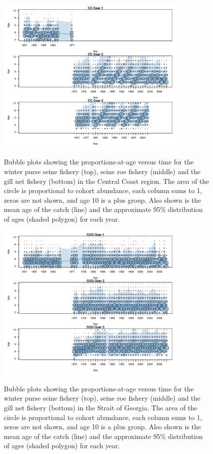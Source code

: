 \begin{figure}
	\centering
	\includegraphics[width=0.85\textwidth]{../Figs/iscam_fig_AgeCompsCC.pdf}\\
	\caption{Bubble plots showing the proportions-at-age versus time for the winter purse seine fishery (top), seine roe fishery (middle) and the gill net fishery (bottom) in the Central Coast region.  The area of the circle is proportional to cohort abundance, each column sums to 1, zeros are not shown, and age 10 is a plus group. Also shown is the mean age of the catch (line) and the approximate 95\% distribution of ages (shaded polygon) for each year.}\label{FigAgeCompsCC}
\end{figure}

\begin{figure}
	\centering
	\includegraphics[width=0.85\textwidth]{../Figs/iscam_fig_AgeCompsSOG.pdf}\\
	\caption{Bubble plots showing the proportions-at-age versus time for the winter purse seine fishery (top), seine roe fishery (middle) and the gill net fishery (bottom) in the Strait of Georgia.  The area of the circle is proportional to cohort abundance, each column sums to 1, zeros are not shown, and age 10 is a plus group. Also shown is the mean age of the catch (line) and the approximate 95\% distribution of ages (shaded polygon) for each year.}\label{FigAgeCompsSOG}
\end{figure}

